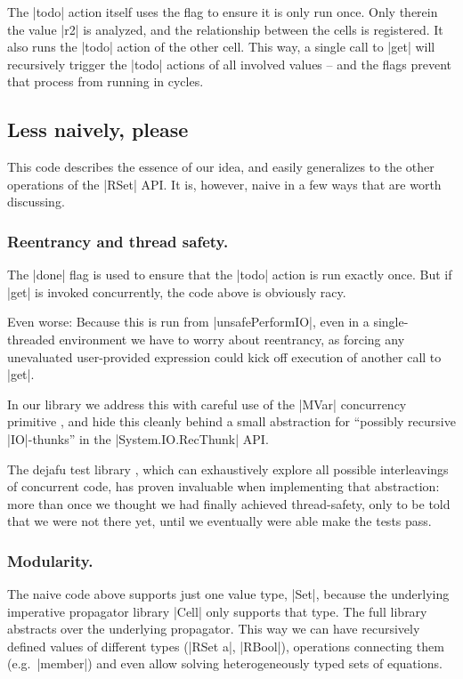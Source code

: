 \documentclass[manuscript,review,screen,acmsmall]{acmart}
\begin{document}
The |todo| action itself uses the flag to ensure it is only run once. Only therein the value |r2| is analyzed, and the relationship between the cells is registered. It also runs the |todo| action of the other cell. This way, a single call to |get| will recursively trigger the |todo| actions of all involved values -- and the flags prevent that process from running in cycles.

\subsection{Less naively, please}

This code describes the essence of our idea, and easily generalizes to the other operations of the |RSet| API. It is, however, naive in a few ways that are worth discussing.

\subsubsection{Reentrancy and thread safety.}\label{sec:thread}

The |done| flag is used to ensure that the |todo| action is run exactly once. But if |get| is invoked concurrently, the code above is obviously racy.

Even worse: Because this is run from |unsafePerformIO|, even in a single-threaded environment we have to worry about reentrancy, as forcing any unevaluated user-provided expression could kick off execution of another call to |get|.

In our library we address this with careful use of the |MVar| concurrency primitive \cite{concurrent}, and hide this cleanly behind a small abstraction for “possibly recursive |IO|-thunks” in the |System.IO.RecThunk| API.

The dejafu test library \citep{dejafu}, which can exhaustively explore all possible interleavings of concurrent code, has proven invaluable when implementing that abstraction: more than once we thought we had finally achieved thread-safety, only to be told that we were not there yet, until we eventually were able make the tests pass.

\subsubsection{Modularity.}

The naive code above supports just one value type, |Set|, because the underlying imperative propagator library |Cell| only supports that type. The full library abstracts over the underlying propagator. This way we can have recursively defined values of different types (|RSet a|, |RBool|), operations connecting them (e.g.\ |member|) and even allow solving heterogeneously typed sets of equations.
\end{document}
